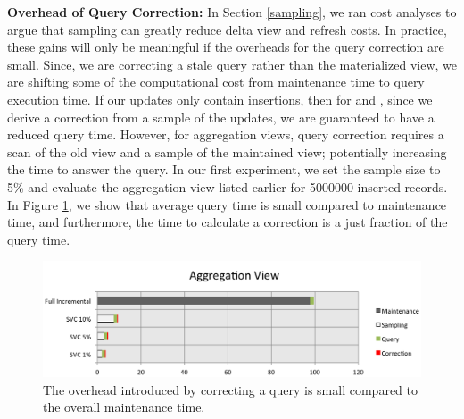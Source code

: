 {\noindent \bf Overhead of Query Correction: }
In Section \ref{sampling}, we ran cost analyses to argue that sampling can greatly reduce delta view and refresh costs.
In practice, these gains will only be meaningful if the overheads for the query correction are small.
Since, we are correcting a stale query rather than the materialized view, we are shifting some of the computational cost from maintenance time to query execution time.
If our updates only contain insertions, then for \spview and \fjview, since we derive a correction from a sample of the updates, we are guaranteed to have a reduced query time.
However, for aggregation views, query correction requires a scan of the old view and a sample of the maintained view; potentially increasing the time to 
answer the query. 
In our first experiment, we set the sample size to 5\% and evaluate the aggregation view listed earlier for 5000000 inserted records. 
In Figure \ref{exp10overheads}, we show that average query time is small compared to maintenance time, and furthermore, 
the time to calculate a correction is a just fraction of the query time.
\begin{figure}[h]
\label{exp10overheads}
\centering
 \includegraphics[width=\columnwidth]{exp/total_time_agg_view.png}
 \caption{The overhead introduced by correcting a query is small compared to the overall maintenance time.}
\end{figure}

